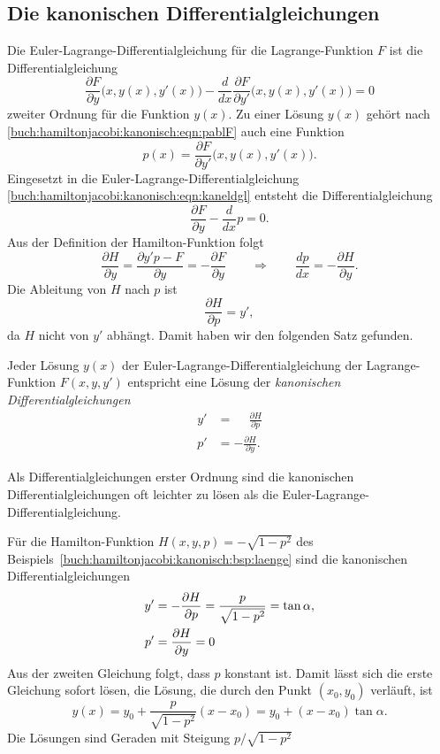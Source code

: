 %
%
\subsection{Die kanonischen Differentialgleichungen}
Die Euler-Lagrange-Differentialgleichung für die Lagrange-Funktion $F$ ist 
die Differentialgleichung
\begin{equation}
\frac{\partial F}{\partial y}\bigl(x,y(x),y'(x)\bigr)
-
\frac{d}{dx}
\frac{\partial F}{\partial y'}\bigl(x,y(x),y'(x)\bigr)
=
0
\label{buch:hamiltonjacobi:kanonisch:eqn:kaneldgl}
\end{equation}
zweiter Ordnung für die Funktion $y(x)$.
Zu einer Lösung $y(x)$ gehört nach
\eqref{buch:hamiltonjacobi:kanonisch:eqn:pablF}
auch eine Funktion
\[
p(x)
=
\frac{\partial F}{\partial y'}\bigl(x,y(x),y'(x)\bigr).
\]
Eingesetzt in die Euler-Lagrange-Differentialgleichung
\eqref{buch:hamiltonjacobi:kanonisch:eqn:kaneldgl}
entsteht die Differentialgleichung
\[
\frac{\partial F}{\partial y}
-
\frac{d}{dx}p
=
0.
\]
Aus der Definition der Hamilton-Funktion folgt
\[
\frac{\partial H}{\partial y}
=
\frac{\partial y'p-F}{\partial y}
=
-\frac{\partial F}{\partial y}
\qquad\Rightarrow\qquad
\frac{dp}{dx}
=
-
\frac{\partial H}{\partial y}.
\]
Die Ableitung von $H$ nach $p$ ist
\[
\frac{\partial H}{\partial p}
=
y',
\]
da $H$ nicht von $y'$ abhängt.
Damit haben wir den folgenden Satz gefunden.

\begin{satz}
Jeder Lösung $y(x)$ der Euler-Lagrange-Differentialgleichung der
Lagrange-Funktion $F(x,y,y')$ entspricht eine Lösung
der {\em kanonischen Differentialgleichungen}
\begin{equation}
\begin{aligned}
y'&=\phantom{-}\frac{\partial H}{\partial p}
\\
p'&=-\frac{\partial H}{\partial y}.
\end{aligned}
\end{equation}
\end{satz}

Als Differentialgleichungen erster Ordnung sind die kanonischen
Differentialgleichungen oft leichter zu lösen als die
Euler-Lagrange-Differentialgleichung.

\begin{beispiel}
Für die Hamilton-Funktion 
$H(x,y,p) = -\sqrt{1-p^2}$
des Beispiels~\ref{buch:hamiltonjacobi:kanonisch:bsp:laenge} sind
die kanonischen Differentialgleichungen
\begin{align}
y'
&=
-\frac{\partial H}{\partial p}
=
\frac{p}{\sqrt{1-p^2}} = \tan\alpha,
\notag
\\
p'
&=
\frac{\partial H}{\partial y}=0
\notag
\end{align}
Aus der zweiten Gleichung folgt, dass $p$ konstant ist.
Damit lässt sich die erste Gleichung sofort lösen, die Lösung, die
durch den Punkt $(x_0,y_0)$ verläuft, ist
\[
y(x)
=
y_0+\frac{p}{\sqrt{1-p^2}}(x-x_0)
=
y_0+ (x-x_0) \tan\alpha.
\]
Die Lösungen sind Geraden mit Steigung $p/\sqrt{1-p^2}$
\end{beispiel}

